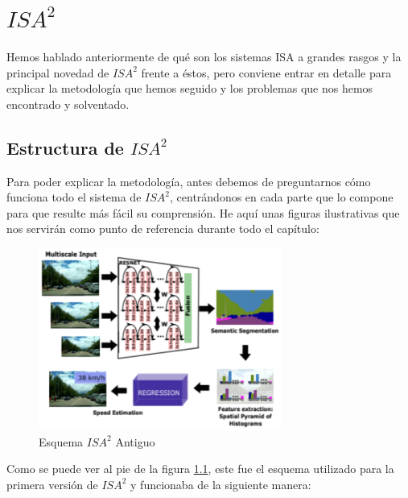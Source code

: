 \chapter{$ISA^{2}$}

Hemos hablado anteriormente de qué son los sistemas \ac{ISA} a grandes rasgos y la principal novedad de $ISA^{2}$ frente a éstos, pero conviene entrar en detalle para explicar la metodología que hemos seguido y los problemas que nos hemos encontrado y solventado.

\section{Estructura de $ISA^{2}$}

Para poder explicar la metodología, antes debemos de preguntarnos cómo funciona todo el sistema de $ISA^{2}$, centrándonos en cada parte que lo compone para que resulte más fácil su comprensión. He aquí unas figuras ilustrativas que nos servirán como punto de referencia durante todo el capítulo:


\begin{figure}[h]
  \centering
  \includegraphics[width=8cm]{Figuras/Figura_Esquema_ISA2_Version_1_SegSem.eps}
  \caption{Esquema $ISA^{2}$ Antiguo}
  \label{fig:Isa_v1}
\end{figure}


Como se puede ver al pie de la figura \ref{fig:Isa_v1}, este fue el esquema utilizado para la primera versión de $ISA^{2}$ \cite{isa2} y funcionaba de la siguiente manera:


